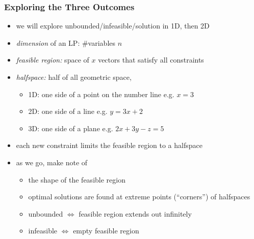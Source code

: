 \documentclass[10pt,aspectratio=169]{beamer}
\begin{document}
\begin{frame} \frametitle{Exploring the Three Outcomes}
\begin{itemize}
  \item we will explore unbounded/infeasible/solution in 1D, then 2D
  \item \emph{dimension} of an LP: \#variables $n$
  \item \emph{feasible region:} space of $x$ vectors that satisfy all constraints
  \item \emph{halfspace:} half of all geometric space,
    \begin{itemize}
      \item 1D: one side of a point on the number line e.g. $x=3$
      \item 2D: one side of a line e.g. $y=3x+2$
      \item 3D: one side of a plane e.g. $2x+3y-z=5$
    \end{itemize}
  \item each new constraint limits the feasible region to a halfspace
  \item as we go, make note of
  \begin{itemize}
    \item the shape of the feasible region
    \item optimal solutions are found at extreme points (``corners'') of halfspaces
    \item unbounded $\Leftrightarrow$ feasible region extends out infinitely
    \item infeasible $\Leftrightarrow$ empty feasible region
  \end{itemize}
\end{itemize}
\end{frame}
\end{document}
